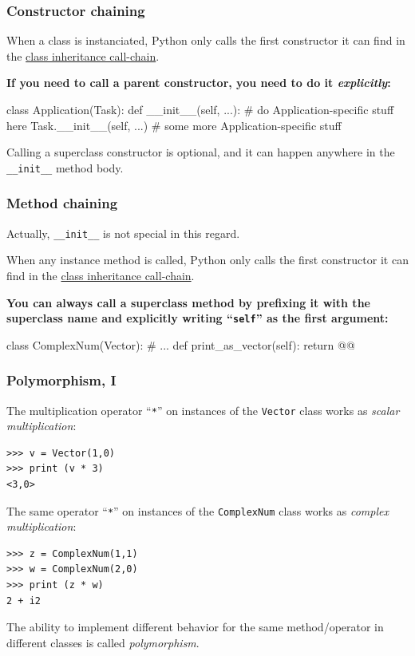 \documentclass[english,serif,mathserif,xcolor=pdftex,dvipsnames,table]{beamer}
\begin{document}
\begin{frame}[fragile]
  \frametitle{Constructor chaining}

    When a class is instanciated, Python only calls the first
    constructor it can find in the
    \href{http://www.python.org/download/releases/2.3/mro/}{class inheritance call-chain}.

    \+ \textbf{If you need to call a parent constructor, you need
      to do it \emph{explicitly}:}
    \begin{python}
class Application(Task):
  def __init__(self, ...):
    # do Application-specific stuff here
    Task.__init__(self, ...)
    # some more Application-specific stuff
    \end{python}

    \+
    Calling a superclass constructor is optional, and
    it can happen anywhere in the \lstinline|__init__| method body.
\end{frame}


\begin{frame}[fragile]
  \frametitle{Method chaining}

  Actually, \lstinline|__init__| is not special in this regard.

  \+ When any instance method is called, Python only calls the first
  constructor it can find in the
  \href{http://www.python.org/download/releases/2.3/mro/}{class
    inheritance call-chain}.

  \+ \textbf{You can always call a superclass method by prefixing it
    with the superclass name and explicitly writing ``\texttt{self}''
    as the first argument:}
    \begin{python}
class ComplexNum(Vector):
  # ...
  def print_as_vector(self):
    return @@
    \end{python}
\end{frame}


\begin{frame}[fragile]
  \frametitle{Polymorphism, I}

  The multiplication operator ``\texttt{*}'' on instances of the
  \lstinline|Vector| class works as \emph{scalar multiplication}:
\begin{lstlisting}
>>> v = Vector(1,0)
>>> print (v * 3)
<3,0>
\end{lstlisting}

  \+
  The same operator ``\texttt{*}'' on instances of the
  \lstinline|ComplexNum| class works as \emph{complex multiplication}:
\begin{lstlisting}
>>> z = ComplexNum(1,1)
>>> w = ComplexNum(2,0)
>>> print (z * w)
2 + i2
\end{lstlisting}

  \+\small
  The ability to implement different behavior for the same
  method/operator in different classes is called \emph{polymorphism}.

\end{frame}
\end{document}
